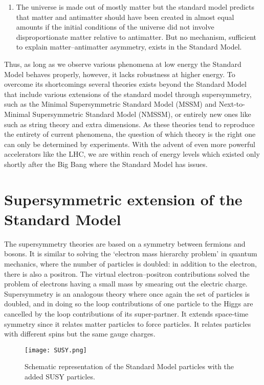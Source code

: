 \begin{enumerate}
	\item{The universe is made out of mostly matter but the standard model predicts that matter and antimatter should have been created in almost equal amounts if the initial conditions of the universe did not involve disproportionate matter relative to antimatter\cite{matterAntimatter}. But no mechanism, sufficient to explain matter--antimatter asymmetry, exists in the Standard Model.}
\end{enumerate}

Thus, as long as we observe various phenomena at low energy the Standard Model behaves properly, however, it lacks robustness at higher energy. To overcome its shortcomings several theories exists beyond the Standard Model that include various extensions of the standard model through supersymmetry, such as the Minimal Supersymmetric Standard Model (MSSM)\cite{MSSM,MSSM2} and Next-to-Minimal Supersymmetric Standard Model (NMSSM)\cite{NSSM1}, or entirely new ones like such as string theory\cite{StringTheory} and extra dimensions\cite{ExtraDimensions}. As these theories tend to reproduce the entirety of current phenomena, the question of which theory is the right one can only be determined by experiments. With the advent of even more powerful accelerators like the LHC, we are within reach of energy levels which existed only shortly after the Big Bang where the Standard Model has issues.

\section{Supersymmetric extension of the Standard Model}

The supersymmetry theories are based on a symmetry between fermions and bosons. It is similar to solving the `electron mass hierarchy problem' in quantum mechanics, where the number of particles is doubled: in addition to the electron, there is also a positron. The virtual electron--positron contributions solved the problem of electrons having a small mass by smearing out the electric charge. Supersymmetry is an analogous theory where once again the set of particles is doubled, and in doing so the loop contributions of one particle to the Higgs are cancelled by the loop contributions of its super-partner. It extends space-time symmetry since it relates matter particles to force particles. It relates particles with different spins but the same gauge charges.

\begin{figure}[H]
\begin{center}
\texttt{[image: SUSY.png]} 
\caption[Schematic representation of the Standard Model particles with the added SUSY particles.]{Schematic representation of the Standard Model particles with the added SUSY particles.}
\label{SUSY} 
\end{center}
\end{figure}

